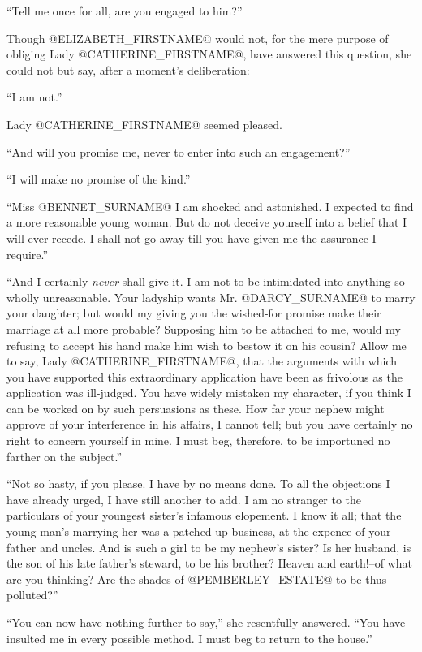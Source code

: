``Tell me once for all, are you engaged to him?''

Though @ELIZABETH_FIRSTNAME@ would not, for the mere purpose of obliging Lady
@CATHERINE_FIRSTNAME@, have answered this question, she could not but say, after a
moment's deliberation:

``I am not.''

Lady @CATHERINE_FIRSTNAME@ seemed pleased.

``And will you promise me, never to enter into such an engagement?''

``I will make no promise of the kind.''

``Miss @BENNET_SURNAME@ I am shocked and astonished. I expected to find a more
reasonable young woman. But do not deceive yourself into a belief that
I will ever recede. I shall not go away till you have given me the
assurance I require.''

``And I certainly \textit{never} shall give it. I am not to be intimidated into
anything so wholly unreasonable. Your ladyship wants Mr. @DARCY_SURNAME@ to marry
your daughter; but would my giving you the wished-for promise make their
marriage at all more probable? Supposing him to be attached to me, would
my refusing to accept his hand make him wish to bestow it on his cousin?
Allow me to say, Lady @CATHERINE_FIRSTNAME@, that the arguments with which you have
supported this extraordinary application have been as frivolous as the
application was ill-judged. You have widely mistaken my character, if
you think I can be worked on by such persuasions as these. How far your
nephew might approve of your interference in his affairs, I cannot tell;
but you have certainly no right to concern yourself in mine. I must beg,
therefore, to be importuned no farther on the subject.''

``Not so hasty, if you please. I have by no means done. To all the
objections I have already urged, I have still another to add. I am
no stranger to the particulars of your youngest sister's infamous
elopement. I know it all; that the young man's marrying her was a
patched-up business, at the expence of your father and uncles. And is
such a girl to be my nephew's sister? Is her husband, is the son of his
late father's steward, to be his brother? Heaven and earth!--of what are
you thinking? Are the shades of @PEMBERLEY_ESTATE@ to be thus polluted?''

``You can now have nothing further to say,'' she resentfully answered.
``You have insulted me in every possible method. I must beg to return to
the house.''

